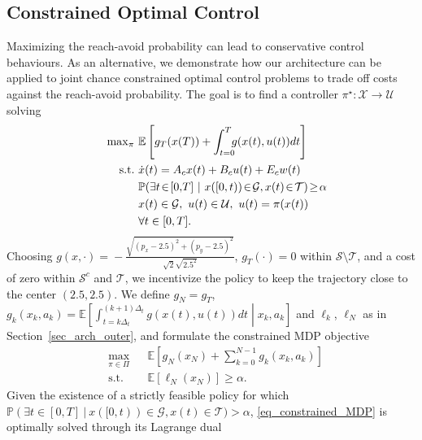 \documentclass{IEEEtran}
\begin{document}
\subsection{Constrained Optimal Control}
\label{sec_num_jcc}
Maximizing the reach-avoid probability can lead to conservative control behaviours. As an alternative, we demonstrate how our architecture can be applied to joint chance constrained optimal control problems to trade off costs against the reach-avoid probability. The goal is to find a controller $\pi^{\star}:\mathcal{X}\rightarrow\mathcal{U}$ solving
\begin{subequations}
\label{eq_num_jcc_problem}
        \label{eq_problem_formulation_jcc}%
    \begin{align}
       &&{\max}_{\pi} & \ \mathbb{E}\left[g_T(x(T)) + \int_{t=0}^{T}\hspace{-.5em}g(x(t),u(t))dt\right] \\
        && \text{s.t.} & \ \dot x(t)=A_cx(t)+B_cu(t)+E_cw(t) \\
        &&& \ \mathbb{P}(\exists t\!\in\![0,\!T]\ |\ x([0,t))\!\in\!\mathcal{G}, x(t)\!\in\!\mathcal{T})\!\geq\!\alpha \\
        &&&\ x(t)\in\mathcal{G}, \ u(t)\in\mathcal{U}, \ u(t)=\pi(x(t)) \\
        &&&\ \forall t\in[0,T].
    \end{align}
\end{subequations} 
Choosing $g(x,\cdot)\!=\!-\frac{\sqrt{(p_x-2.5)^2+(p_y-2.5)^2}}{\sqrt{2}\sqrt{2.5^2}}$, $g_T(\cdot)\!=\!0$ within $\mathcal{S}\setminus\mathcal{T}$, and a cost of zero within $\mathcal{S}^c$ and $\mathcal{T}$, we incentivize the policy to keep the trajectory close to the center $(2.5,2.5)$. We define $g_N\!=\!g_T$, $g_k({x}_k,\!a_k)\!=\!\mathbb{E}\!\left[\int_{t=k\Delta_t}^{(k+1)\Delta_t}g(x(t),\!u(t))dt\middle|x_k,\!a_k\right]$ and $\ell_k$, $\ell_N$ as in Section~\ref{sec_arch_outer}, and formulate the constrained MDP objective
\begin{subequations}%
    \begin{align}
        &\max_{\pi\in\Pi} &&\mathbb{E}\left[g_N({x}_N) + \sum_{k=0}^{N-1}g_k({x}_k,a_k)\right] \\
        & \text{s.t.} && \mathbb{E}[\ell_N({x}_N)]\geq \alpha.
    \end{align}%
    \label{eq_constrained_MDP}%
\end{subequations}%
Given the existence of a strictly feasible policy for which $\mathbb{P}(\exists t\!\in\![0,\!T]\ |\ x([0,t))\!\in\!\mathcal{G}, x(t)\!\in\!\mathcal{T})\!>\!\alpha$, \eqref{eq_constrained_MDP} is optimally solved through its Lagrange dual \cite{schmid2023Jccoc}
\end{document}
